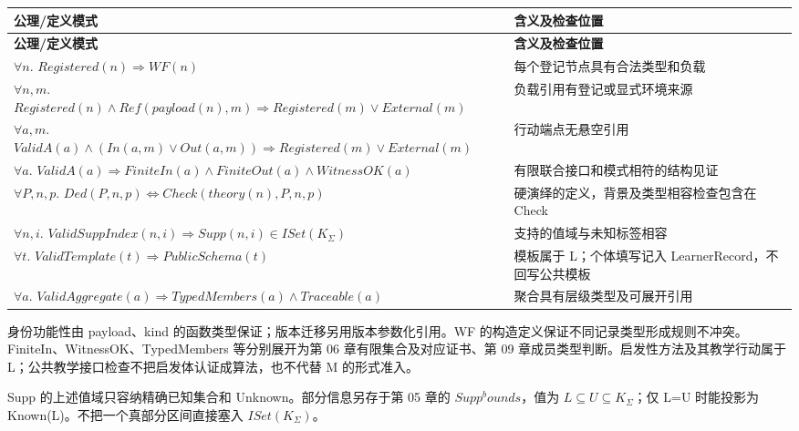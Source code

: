 \documentclass[UTF8,a4paper,zihao=-4,fontset=windows,openany]{ctexbook}
\def\mathrm#1{#1}%
\begin{document}
\begingroup\small\setlength{\tabcolsep}{4pt}
\begin{longtable}{>{\raggedright\arraybackslash}p{}>{\raggedright\arraybackslash}p{}}
\toprule
\textbf{公理/定义模式} & \textbf{含义及检查位置} \\
\midrule
\endfirsthead
\toprule
\textbf{公理/定义模式} & \textbf{含义及检查位置} \\
\midrule
\endhead
\bottomrule
\endfoot
\bottomrule
\endlastfoot
\(\forall n.\) \(\mathrm{Registered}(n)\Rightarrow\mathrm{WF}(n)\) & 每个登记节点具有合法类型和负载 \\
\(\forall n,m.\) \(\mathrm{Registered}(n)\land\mathrm{Ref}(\mathrm{payload}(n),m)\Rightarrow\mathrm{Registered}(m)\lor\mathrm{External}(m)\) & 负载引用有登记或显式环境来源 \\
\(\forall a,m.\) \(\mathrm{ValidA}(a)\land(\mathrm{In}(a,m)\lor\mathrm{Out}(a,m))\Rightarrow\mathrm{Registered}(m)\lor\mathrm{External}(m)\) & 行动端点无悬空引用 \\
\(\forall a.\) \(\mathrm{ValidA}(a)\Rightarrow\mathrm{FiniteIn}(a)\land\mathrm{FiniteOut}(a)\land\mathrm{WitnessOK}(a)\) & 有限联合接口和模式相符的结构见证 \\
\(\forall P,n,p.\) \(\mathrm{Ded}(P,n,p)\Leftrightarrow\mathrm{Check}(\mathrm{theory}(n),P,n,p)\) & 硬演绎的定义，背景及类型相容检查包含在 Check \\
\(\forall n,i.\) \(\mathrm{ValidSuppIndex}(n,i)\Rightarrow\mathrm{Supp}(n,i)\in\mathrm{ISet}(K_\Sigma)\) & 支持的值域与未知标签相容 \\
\(\forall t.\) \(\mathrm{ValidTemplate}(t)\Rightarrow\mathrm{PublicSchema}(t)\) & 模板属于 L；个体填写记入 LearnerRecord，不回写公共模板 \\
\(\forall a.\) \(\mathrm{ValidAggregate}(a)\Rightarrow\mathrm{TypedMembers}(a)\land\mathrm{Traceable}(a)\) & 聚合具有层级类型及可展开引用 \\
\end{longtable}
\endgroup

身份功能性由 payload、kind 的函数类型保证；版本迁移另用版本参数化引用。WF 的构造定义保证不同记录类型形成规则不冲突。FiniteIn、WitnessOK、TypedMembers 等分别展开为第 06 章有限集合及对应证书、第 09 章成员类型判断。启发性方法及其教学行动属于 L；公共教学接口检查不把启发体认证成算法，也不代替 M 的形式准入。

Supp 的上述值域只容纳精确已知集合和 Unknown。部分信息另存于第 05 章的 \(\mathrm{Supp}^\mathrm{bounds}\)，值为 \(L\subseteq U\subseteq K_\Sigma\)；仅 L=U 时能投影为 Known(L)。不把一个真部分区间直接塞入 \(\mathrm{ISet}(K_\Sigma)\)。
\end{document}
